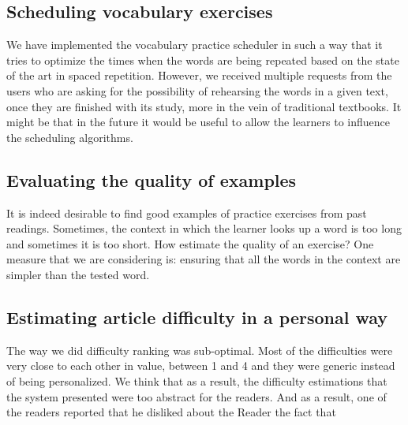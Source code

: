 \subsection{Scheduling vocabulary exercises}
We have implemented the vocabulary practice scheduler in such a way that it tries to optimize the times when the words are being repeated based on the state of the art in spaced repetition. However, we received multiple requests from the users who are asking for the possibility of rehearsing the words in a given text, once they are finished with its study, more in the vein of traditional textbooks. It might be that in the future it would be useful to allow the learners to influence the scheduling algorithms. 



\subsection{Evaluating the quality of examples}

It is indeed desirable to find good examples of practice exercises from past readings. Sometimes, the context in which the learner looks up a word is too long and sometimes it is too short. How estimate the quality of an exercise? One measure that we are considering is: ensuring that all the words in the context are simpler than the tested word. 


\subsection{Estimating article difficulty in a personal way}
The way we did difficulty ranking was sub-optimal. Most of the difficulties were very close to each other in value, between 1 and 4 and they were generic instead of being personalized. We think that as a result, the difficulty estimations that the system presented were too abstract for the readers. And as a result, one of the readers reported that he disliked about the Reader the fact that  

